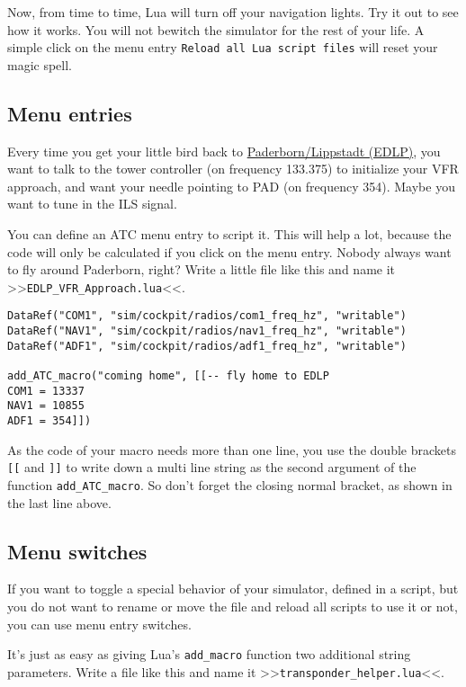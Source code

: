 \documentclass[11pt,parskip=half,a4paper]{scrartcl}
\begin{document}
Now, from time to time, Lua will turn off your navigation lights. Try it out to see how it works. You will not bewitch the simulator for the rest of your life. A simple click on the menu entry \verb|Reload all Lua script files| will reset your magic spell.

\subsection{Menu entries}

Every time you get your little bird back to \href{http://nav.vatsim-germany.org/files/edgg/charts/edlp/public/EDLP_ILS24.pdf}{Paderborn/Lippstadt (EDLP)}, you want to talk to the tower controller (on frequency 133.375) to initialize your VFR approach, and want your needle pointing to PAD (on frequency 354). Maybe you want to tune in the ILS signal.

You can define an ATC menu entry to script it. This will help a lot, because the code will only be calculated if you click on the menu entry. Nobody always want to fly around Paderborn, right? Write a little file like this and name it >>\verb|EDLP_VFR_Approach.lua|<<.

\begin{lstlisting}
DataRef("COM1", "sim/cockpit/radios/com1_freq_hz", "writable")
DataRef("NAV1", "sim/cockpit/radios/nav1_freq_hz", "writable")
DataRef("ADF1", "sim/cockpit/radios/adf1_freq_hz", "writable")

add_ATC_macro("coming home", [[-- fly home to EDLP
COM1 = 13337
NAV1 = 10855
ADF1 = 354]])
\end{lstlisting}

As the code of your macro needs more than one line, you use the double brackets \verb|[[| and \verb|]]| to write down a multi line string as the second argument of the function \verb|add_ATC_macro|. So don't forget the closing normal bracket, as shown in the last line above.

\subsection{Menu switches}

If you want to toggle a special behavior of your simulator, defined in a script, but you do not want to rename or move the file and reload all scripts to use it or not, you can use menu entry switches.

It's just as easy as giving Lua's \verb|add_macro| function two additional string parameters. Write a file like this and name it >>\verb|transponder_helper.lua|<<.
\end{document}
